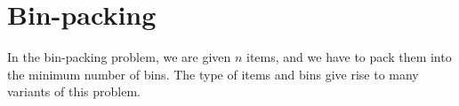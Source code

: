 \section{Bin-packing}

In the bin-packing problem, we are given $n$ items, and we have to pack them
into the minimum number of bins.
The type of items and bins give rise to many variants of this problem.



%
